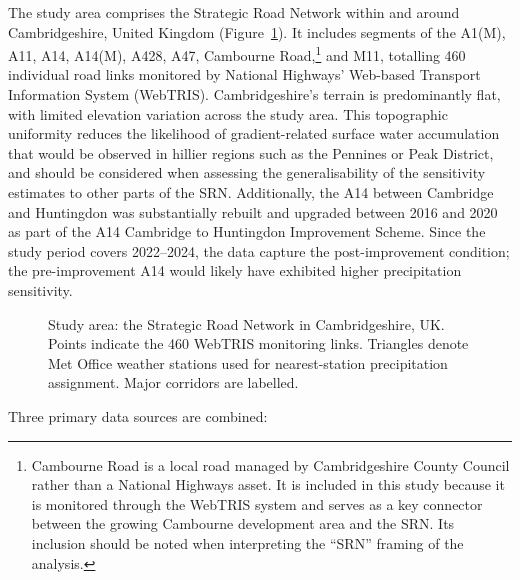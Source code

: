 \documentclass[review]{elsarticle}
\begin{document}
The study area comprises the Strategic Road Network within and around Cambridgeshire, United Kingdom (Figure~\ref{fig:study_area}). It includes segments of the A1(M), A11, A14, A14(M), A428, A47, Cambourne Road,\footnote{Cambourne Road is a local road managed by Cambridgeshire County Council rather than a National Highways asset. It is included in this study because it is monitored through the WebTRIS system and serves as a key connector between the growing Cambourne development area and the SRN. Its inclusion should be noted when interpreting the ``SRN'' framing of the analysis.} and M11, totalling 460 individual road links monitored by National Highways' Web-based Transport Information System (WebTRIS). Cambridgeshire's terrain is predominantly flat, with limited elevation variation across the study area. This topographic uniformity reduces the likelihood of gradient-related surface water accumulation that would be observed in hillier regions such as the Pennines or Peak District, and should be considered when assessing the generalisability of the sensitivity estimates to other parts of the SRN. Additionally, the A14 between Cambridge and Huntingdon was substantially rebuilt and upgraded between 2016 and 2020 as part of the A14 Cambridge to Huntingdon Improvement Scheme. Since the study period covers 2022--2024, the data capture the post-improvement condition; the pre-improvement A14 would likely have exhibited higher precipitation sensitivity.

\begin{figure}[htbp]
\centering
\caption{Study area: the Strategic Road Network in Cambridgeshire, UK. Points indicate the 460 WebTRIS monitoring links. Triangles denote Met Office weather stations used for nearest-station precipitation assignment. Major corridors are labelled.}
\label{fig:study_area}
\end{figure}

Three primary data sources are combined:
\end{document}
